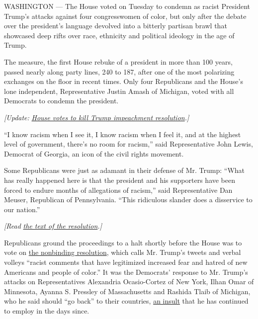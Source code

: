 WASHINGTON --- The House voted on Tuesday to condemn as racist President
Trump's attacks against four congresswomen of color, but only after the
debate over the president's language devolved into a bitterly partisan
brawl that showcased deep rifts over race, ethnicity and political
ideology in the age of Trump.

The measure, the first House rebuke of a president in more than 100
years, passed nearly along party lines, 240 to 187, after one of the
most polarizing exchanges on the floor in recent times. Only four
Republicans and the House's lone independent, Representative Justin
Amash of Michigan, voted with all Democrats to condemn the president.

\emph{{[}Update:}
\href{https://www.nytimes3xbfgragh.onion/2019/07/17/us/politics/house-impeachment-trump.html}{\emph{House
votes to kill Trump impeachment resolution}}\emph{.{]}}

``I know racism when I see it, I know racism when I feel it, and at the
highest level of government, there's no room for racism,'' said
Representative John Lewis, Democrat of Georgia, an icon of the civil
rights movement.

Some Republicans were just as adamant in their defense of Mr. Trump:
``What has really happened here is that the president and his supporters
have been forced to endure months of allegations of racism,'' said
Representative Dan Meuser, Republican of Pennsylvania. ``This ridiculous
slander does a disservice to our nation.''

\emph{{[}Read}
\href{https://www.nytimes3xbfgragh.onion/2019/07/16/us/politics/house-resolution-condemning-trump.html}{\emph{the
text of the resolution}}\emph{.{]}}

Republicans ground the proceedings to a halt shortly before the House
was to vote on
\href{https://www.congress.gov/bill/116th-congress/house-resolution/489/text?q=\%7B\%22search\%22\%3A\%5B\%22racist\%22\%2C\%22racist\%22\%5D\%7D\&r=2\&s=3}{the
nonbinding resolution}, which calls Mr. Trump's tweets and verbal
volleys ``racist comments that have legitimized increased fear and
hatred of new Americans and people of color.'' It was the Democrats'
response to Mr. Trump's attacks on Representatives Alexandria
Ocasio-Cortez of New York, Ilhan Omar of Minnesota, Ayanna S. Pressley
of Massachusetts and Rashida Tlaib of Michigan, who he said should ``go
back'' to their countries,
\href{https://www.nytimes3xbfgragh.onion/2019/07/16/us/politics/aoc-trump-tlaib-omar-pressley.html}{an
insult} that he has continued to employ in the days since.

